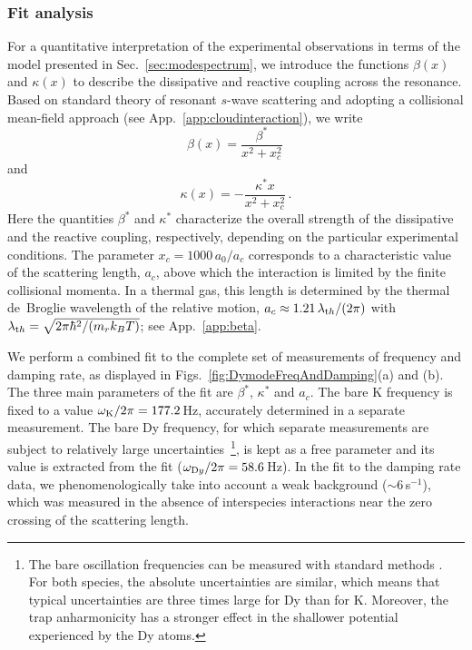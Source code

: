 \subsubsection{Fit analysis}
\label{sssec:fitanalysis}

For a quantitative interpretation of the experimental observations in terms of the model presented in Sec.~\ref{sec:modespectrum}, we introduce the functions $\beta(x)$ and $\kappa(x)$ to describe the dissipative and reactive coupling across the resonance. Based on standard theory of resonant $s$-wave scattering and adopting a collisional mean-field approach (see App.~\ref{app:cloudinteraction}), we write
\begin{equation}
\beta(x) = \frac{\beta^*}{x^2 + x_c^2} \, 
\label{eq:betax}
\end{equation}
and
\begin{equation}
\kappa(x) = -\frac{\kappa^* x}{x^2 + x_c^2} \, .
\label{eq:kappax}
\end{equation} 
Here the quantities $\beta^*$ and $\kappa^*$ characterize the overall strength of the dissipative and the reactive coupling, respectively, depending on the  particular experimental conditions. The parameter $x_c = 1000\,a_0/a_c$ corresponds to a characteristic value of the scattering length, $a_c$, above which the interaction is limited by the finite collisional momenta. In a thermal gas, this length is determined by the thermal de~Broglie wavelength of the relative motion, $a_c \approx 1.21\,{\lambda_{\textrm th}}/(2 \pi)$ with $\lambda_{\textrm th} = \sqrt{2 \pi \hbar^2/(m_r k_B T)}$; see App.~\ref{app:beta}.

We perform a combined fit to the complete set of measurements of frequency and damping rate, as displayed in Figs.~\ref{fig:DymodeFreqAndDamping}(a) and (b). The three main parameters of the fit are $\beta^*$, $\kappa^*$ and $a_c$. 
The bare K frequency is fixed to a value $\omega_{\textrm K}/2\pi = 177.2\,$Hz, accurately determined in a separate measurement. The bare Dy frequency, {for which separate measurements are subject to relatively large uncertainties~\footnote{The bare oscillation frequencies can be measured with standard methods \cite{Ravensbergen2018ado}. For both species, the absolute uncertainties are similar, which means that typical uncertainties are three times large for Dy than for K. Moreover, the trap anharmonicity has a stronger effect in the shallower potential experienced by the Dy atoms.},} is kept as a free parameter and its value is extracted from the fit ($\omega_{\textrm Dy}/2\pi = 58.6\,$Hz). %
In the fit to the damping rate data, we phenomenologically take into account a weak background ($\sim 6$\,s$^{-1}$), which was measured in the absence of interspecies interactions near the zero crossing of the scattering length.

